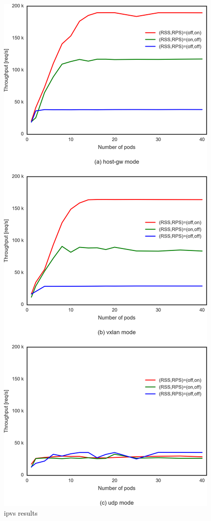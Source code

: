 \begin{figure}
\includegraphics[width=\textwidth]{Figs/ipvs_3figs}
\caption{ipvs results}
\label{fig:ipvs3figs}
\end{figure}

